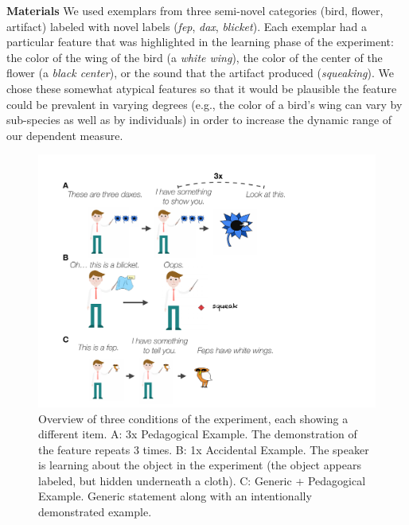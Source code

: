 \documentclass[10pt,letterpaper]{article}
\begin{document}
\noindent\textbf{Materials}
We used exemplars from three semi-novel categories (bird, flower, artifact) labeled with novel labels (\emph{fep}, \emph{dax}, \emph{blicket}).
Each exemplar had a particular feature that was highlighted in the learning phase of the experiment: the color of the wing of the bird (a \emph{white wing}), the color of the center of the flower (a \emph{black center}), or the sound that the artifact produced (\emph{squeaking}). 
We chose these somewhat atypical features so that it would be plausible the feature could be prevalent in varying degrees (e.g., the color of a bird's wing can vary by sub-species as well as by individuals) in order to increase the dynamic range of our dependent measure. 

\begin{figure}[t]
\begin{center}
\includegraphics[width=\linewidth,frame]{figs/expt-cartoon.pdf}
\end{center}
\caption{Overview of three conditions of the experiment, each showing a different item. A: 3x Pedagogical Example. The demonstration of the feature repeats 3 times. B: 1x Accidental Example. The speaker is  learning about the object in the experiment (the object appears labeled, but hidden underneath a cloth). C: Generic + Pedagogical Example. Generic statement along with an intentionally demonstrated example.}
\label{fig:expt}
\end{figure}
\end{document}
